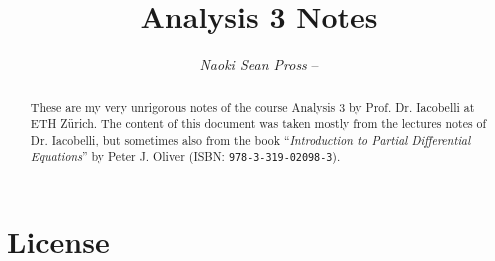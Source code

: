 \documentclass[margin=normal]{tex/hsrzf}
\author{\textsl{Naoki Sean Pross} -- \texttt{\theauthoremail}}
\title{Analysis 3 Notes}
\date{\thesemester}
\begin{document}

\maketitle

\begin{abstract}
  These are my very unrigorous notes of the course Analysis 3 by Prof. Dr.
  Iacobelli at ETH Zürich. The content of this document was taken mostly from
  the lectures notes of Dr. Iacobelli, but sometimes also from the book
  ``\textsl{Introduction to Partial Differential Equations}'' by Peter J. Oliver
  (ISBN: \texttt{978-3-319-02098-3}).
\end{abstract}


\section*{License}
\doclicenseThis

\tableofcontents


\clearpage
\twocolumn 
\setcounter{page}{1}







\appendix


\end{document}
